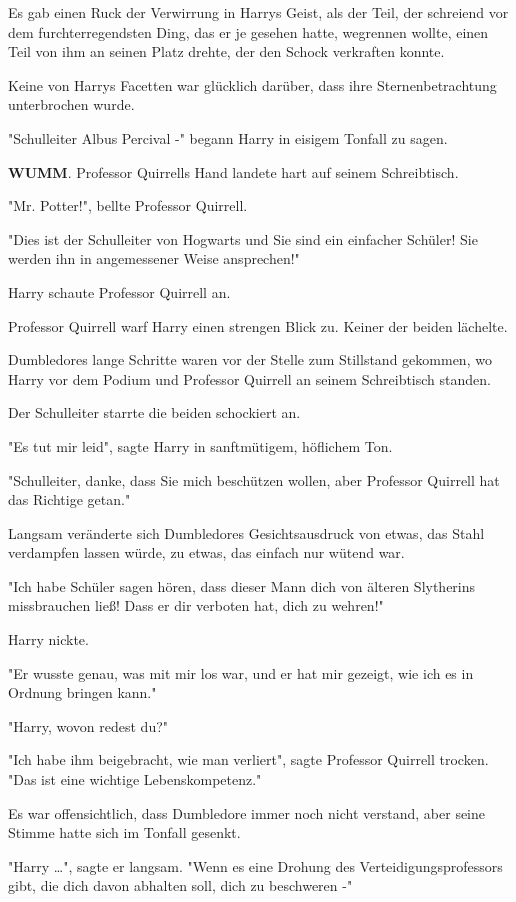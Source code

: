 {Es gab einen Ruck der Verwirrung in Harrys Geist, als der Teil, der schreiend vor dem furchterregendsten Ding, das er je gesehen hatte, wegrennen wollte, einen Teil von ihm an seinen Platz drehte, der den Schock verkraften konnte.

Keine von Harrys Facetten war glücklich darüber, dass ihre Sternenbetrachtung unterbrochen wurde.

"Schulleiter Albus Percival -" begann Harry in eisigem Tonfall zu sagen.

\textbf{WUMM}. Professor Quirrells Hand landete hart auf seinem Schreibtisch.

"Mr. Potter!", bellte Professor Quirrell.

"Dies ist der Schulleiter von Hogwarts und Sie sind ein einfacher Schüler! Sie werden ihn in angemessener Weise ansprechen!"

Harry schaute Professor Quirrell an.

Professor Quirrell warf Harry einen strengen Blick zu. Keiner der beiden lächelte.

Dumbledores lange Schritte waren vor der Stelle zum Stillstand gekommen, wo Harry vor dem Podium und Professor Quirrell an seinem Schreibtisch standen.

Der Schulleiter starrte die beiden schockiert an.

"Es tut mir leid", sagte Harry in sanftmütigem, höflichem Ton.

"Schulleiter, danke, dass Sie mich beschützen wollen, aber Professor Quirrell hat das Richtige getan."

Langsam veränderte sich Dumbledores Gesichtsausdruck von etwas, das Stahl verdampfen lassen würde, zu etwas, das einfach nur wütend war.

"Ich habe Schüler sagen hören, dass dieser Mann dich von älteren Slytherins missbrauchen ließ! Dass er dir verboten hat, dich zu wehren!"

Harry nickte.

"Er wusste genau, was mit mir los war, und er hat mir gezeigt, wie ich es in Ordnung bringen kann."

"Harry, wovon redest du?"

"Ich habe ihm beigebracht, wie man verliert", sagte Professor Quirrell trocken. "Das ist eine wichtige Lebenskompetenz."

Es war offensichtlich, dass Dumbledore immer noch nicht verstand, aber seine Stimme hatte sich im Tonfall gesenkt.

"Harry …", sagte er langsam. "Wenn es eine Drohung des Verteidigungsprofessors gibt, die dich davon abhalten soll, dich zu beschweren -"

}
